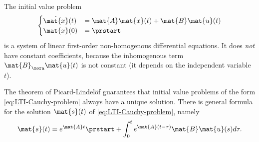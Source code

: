 
\begin{remark}
    The initial value problem
    \begin{align}\label{eq:LTI-Cauchy-problem}
        \begin{cases}
            \dot{\mat{x}}(t) & = \mat{A} \mat{x}(t) + \mat{B} \mat{u}(t) \\
            \mat{x}(0)       & = \prstart
        \end{cases}
    \end{align}
    is a system of linear first-order non-homogenous differential equations.
    It does \emph{not} have constant coefficients, because the inhomogenous term $\mat{B}_\mora\mat{u}(t)$ is not constant (it depends on the independent variable $t$).

    The theorem of Picard-Lindelöf guarantees that initial value problems of the form \cref{eq:LTI-Cauchy-problem} always have a unique solution.
    There is general formula for the solution $\mat{s}(t)$ of \cref{eq:LTI-Cauchy-problem}, namely
    \begin{equation}
        \mat{s}(t) = e^{\mat{A} t} \prstart + \int_{0}^{t} e^{\mat{A} (t - \tau)}\mat{B}\mat{u}(s)d\tau.
    \end{equation}

\end{remark}

